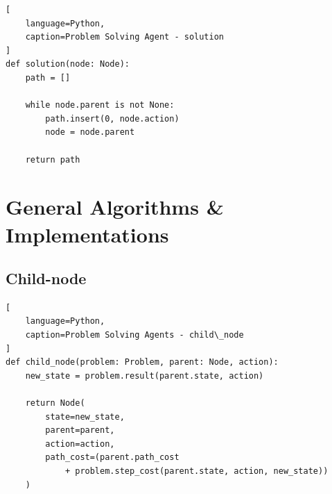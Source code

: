 \begin{lstlisting}[
    language=Python,
    caption=Problem Solving Agent - solution
]
def solution(node: Node):
    path = []

    while node.parent is not None:
        path.insert(0, node.action)
        node = node.parent

    return path
\end{lstlisting}






\section{General Algorithms \& Implementations}

\subsection{Child-node}

\vspace{0.2cm}

\begin{algorithm}[H]
    \caption{The function \textsc{Child-Node} takes a parent node and an action and returns the resulting child node \cite{ai/book/Artificial-Intelligence-A-Modern-Approach/Russell-Norvig}}

\end{algorithm}


\begin{lstlisting}[
    language=Python,
    caption=Problem Solving Agents - child\_node
]
def child_node(problem: Problem, parent: Node, action):
    new_state = problem.result(parent.state, action)

    return Node(
        state=new_state,
        parent=parent,
        action=action,
        path_cost=(parent.path_cost
            + problem.step_cost(parent.state, action, new_state))
    )
\end{lstlisting}



